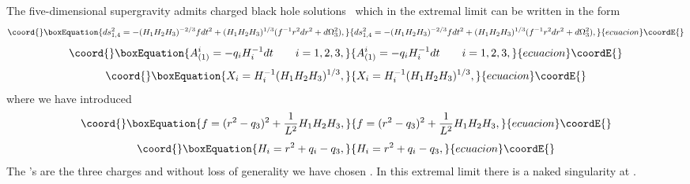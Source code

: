 \documentclass[a4paper,12pt]{article}
\begin{document}
The five-dimensional \coordHE{} supergravity admits charged \coordHE{} black
hole solutions~\cite{Behrndt:1998ns, Behrndt:1998jd} which in the extremal
limit can be written in the form
\begin{equation}\coord{}\boxEquation{
\label{chargedbh1}
ds^2_{1,4} = -(H_1 H_2 H_3)^{-2/3} f dt^{2} + (H_1 H_2 H_3)^{1/3}
(f^{-1} r^2 dr^{2} + d\Omega_3^2),
}{
ds^2_{1,4} = -(H_1 H_2 H_3)^{-2/3} f dt^{2} + (H_1 H_2 H_3)^{1/3}
(f^{-1} r^2 dr^{2} + d\Omega_3^2),
}{ecuacion}\coordE{}\end{equation}
\begin{equation}\coord{}\boxEquation{
\label{chargedbh2}
A_{(1)}^{i} = -q_i H_i^{-1} dt \qquad i=1,2,3,
}{
A_{(1)}^{i} = -q_i H_i^{-1} dt \qquad i=1,2,3,
}{ecuacion}\coordE{}\end{equation}
\begin{equation}\coord{}\boxEquation{
\label{chargedbh3}
X_{i} = H_i^{-1} (H_1 H_2 H_3)^{1/3},
}{
X_{i} = H_i^{-1} (H_1 H_2 H_3)^{1/3},
}{ecuacion}\coordE{}\end{equation}
where we have introduced
\begin{equation}\coord{}\boxEquation{
f = (r^2 - q_3)^2 + \frac{1}{L^2}{H_1 H_2 H_3},
}{
f = (r^2 - q_3)^2 + \frac{1}{L^2}{H_1 H_2 H_3},
}{ecuacion}\coordE{}\end{equation}
\begin{equation}\coord{}\boxEquation{
H_i = r^2 + q_i - q_3,
}{
H_i = r^2 + q_i - q_3,
}{ecuacion}\coordE{}\end{equation}
The \coordHE{}'s are the three \coordHE{} charges and without
loss of generality we have chosen \coordHE{}. In this extremal
limit there is a naked singularity at \coordHE{}.
\end{document}
